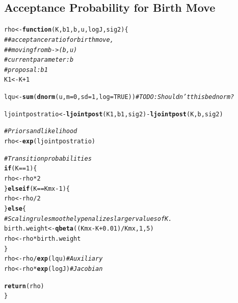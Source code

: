 \documentclass[12pt,letterpaper]{article}\usepackage[]{graphicx}\usepackage[]{color}
\makeatletter
\newcommand{\hlnum}[1]{\textcolor[rgb]{0.686,0.059,0.569}{#1}}%
\newcommand{\hlcom}[1]{\textcolor[rgb]{0.678,0.584,0.686}{\textit{#1}}}%
\newcommand{\hlopt}[1]{\textcolor[rgb]{0,0,0}{#1}}%
\newcommand{\hlstd}[1]{\textcolor[rgb]{0.345,0.345,0.345}{#1}}%
\newcommand{\hlkwa}[1]{\textcolor[rgb]{0.161,0.373,0.58}{\textbf{#1}}}%
\newcommand{\hlkwb}[1]{\textcolor[rgb]{0.69,0.353,0.396}{#1}}%
\newcommand{\hlkwc}[1]{\textcolor[rgb]{0.333,0.667,0.333}{#1}}%
\newcommand{\hlkwd}[1]{\textcolor[rgb]{0.737,0.353,0.396}{\textbf{#1}}}%
\newenvironment{kframe}{%
 \def\at@end@of@kframe{}%
 \ifinner\ifhmode%
  \def\at@end@of@kframe{\end{minipage}}%
  \begin{minipage}{\columnwidth}%
 \fi\fi%
 \def\FrameCommand##1{\hskip\@totalleftmargin \hskip-\fboxsep
 \colorbox{shadecolor}{##1}\hskip-\fboxsep
     \hskip-\linewidth \hskip-\@totalleftmargin \hskip\columnwidth}%
 \MakeFramed {\advance\hsize-\width
   \@totalleftmargin\z@ \linewidth\hsize
   \@setminipage}}%
 {\par\unskip\endMakeFramed%
 \at@end@of@kframe}
\newenvironment{knitrout}{}{} %
\makeatother
\begin{document}
\subsection{Acceptance Probability for Birth Move}
\begin{knitrout}
\color{fgcolor}\begin{kframe}
\begin{alltt}
\hlstd{rho} \hlkwb{<-} \hlkwa{function}\hlstd{(}\hlkwc{K}\hlstd{,} \hlkwc{b1}\hlstd{,} \hlkwc{b}\hlstd{,} \hlkwc{u}\hlstd{,} \hlkwc{logJ}\hlstd{,} \hlkwc{sig2}\hlstd{) \{}
  \hlcom{##  acceptance ratio for birth move,}
  \hlcom{##  moving from b -> (b,u)}
  \hlcom{# current parameter: b}
  \hlcom{# proposal:          b1}
  \hlstd{K1} \hlkwb{<-} \hlstd{K}\hlopt{+}\hlnum{1}

  \hlstd{lqu} \hlkwb{<-} \hlkwd{sum}\hlstd{(}\hlkwd{dnorm}\hlstd{(u,} \hlkwc{m}\hlstd{=}\hlnum{0}\hlstd{,} \hlkwc{sd}\hlstd{=}\hlnum{1}\hlstd{,} \hlkwc{log}\hlstd{=}\hlnum{TRUE}\hlstd{))} \hlcom{# TODO: Shouldn't this be dnorm?}

  \hlstd{ljointpostratio} \hlkwb{<-} \hlkwd{ljointpost}\hlstd{(K1, b1, sig2)} \hlopt{-} \hlkwd{ljointpost}\hlstd{(K, b, sig2)}

  \hlcom{# Priors and likelihood}
  \hlstd{rho} \hlkwb{<-} \hlkwd{exp}\hlstd{(ljointpostratio)}

  \hlcom{# Transition probabilities}
  \hlkwa{if} \hlstd{(K}\hlopt{==}\hlnum{1}\hlstd{) \{}
    \hlstd{rho} \hlkwb{<-} \hlstd{rho}\hlopt{*}\hlnum{2}
  \hlstd{\}} \hlkwa{else if} \hlstd{(K}\hlopt{==}\hlstd{Kmx}\hlopt{-}\hlnum{1}\hlstd{) \{}
    \hlstd{rho} \hlkwb{<-} \hlstd{rho}\hlopt{/}\hlnum{2}
  \hlstd{\}} \hlkwa{else} \hlstd{\{}
    \hlcom{# Scaling rule smoothely penalizes larger values of K.}
    \hlstd{birth.weight} \hlkwb{<-} \hlkwd{qbeta}\hlstd{((Kmx}\hlopt{-}\hlstd{K}\hlopt{+}\hlnum{0.01}\hlstd{)}\hlopt{/}\hlstd{Kmx,} \hlnum{1}\hlstd{,} \hlnum{5}\hlstd{)}
    \hlstd{rho} \hlkwb{<-} \hlstd{rho}\hlopt{*}\hlstd{birth.weight}
  \hlstd{\}}
  \hlstd{rho} \hlkwb{<-} \hlstd{rho}\hlopt{/}\hlkwd{exp}\hlstd{(lqu)}         \hlcom{# Auxiliary}
  \hlstd{rho} \hlkwb{<-} \hlstd{rho}\hlopt{*}\hlkwd{exp}\hlstd{(logJ)}        \hlcom{# Jacobian}

  \hlkwd{return} \hlstd{(rho)}
\hlstd{\}}
\end{alltt}
\end{kframe}
\end{knitrout}
\end{document}

